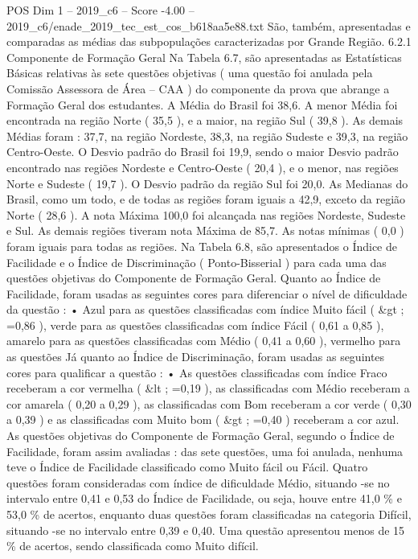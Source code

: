 \begin{textsample}{POS Dim 1 – 2019\_c6 – Score -4.00 – 2019\_c6/enade\_2019\_tec\_est\_cos\_b618aa5e88.txt}
São, também, apresentadas e comparadas as médias das subpopulações caracterizadas por Grande Região. 6.2.1 Componente de Formação Geral Na Tabela 6.7, são apresentadas as Estatísticas Básicas relativas às sete questões objetivas ( uma questão foi anulada pela Comissão Assessora de Área – CAA ) do componente da prova que abrange a Formação Geral dos estudantes.
A Média do Brasil foi 38,6.
A menor Média foi encontrada na região Norte ( 35,5 ), e a maior, na região Sul ( 39,8 ).
As demais Médias foram : 37,7, na região Nordeste, 38,3, na região Sudeste e 39,3, na região Centro-Oeste.
O Desvio padrão do Brasil foi 19,9, sendo o maior Desvio padrão encontrado nas regiões Nordeste e Centro-Oeste ( 20,4 ), e o menor, nas regiões Norte e Sudeste ( 19,7 ).
O Desvio padrão da região Sul foi 20,0.
As Medianas do Brasil, como um todo, e de todas as regiões foram iguais a 42,9, exceto da região Norte ( 28,6 ).
A nota Máxima 100,0 foi alcançada nas regiões Nordeste, Sudeste e Sul.
As demais regiões tiveram nota Máxima de 85,7.
As notas mínimas ( 0,0 ) foram iguais para todas as regiões.
Na Tabela 6.8, são apresentados o Índice de Facilidade e o Índice de Discriminação ( Ponto-Bisserial ) para cada uma das questões objetivas do Componente de Formação Geral.
Quanto ao Índice de Facilidade, foram usadas as seguintes cores para diferenciar o nível de dificuldade da questão : • Azul para as questões classificadas com índice Muito fácil ( \&gt ; =0,86 ), verde para as questões classificadas com índice Fácil ( 0,61 a 0,85 ), amarelo para as questões classificadas com Médio ( 0,41 a 0,60 ), vermelho para as questões Já quanto ao Índice de Discriminação, foram usadas as seguintes cores para qualificar a questão : • As questões classificadas com índice Fraco receberam a cor vermelha ( \&lt ; =0,19 ), as classificadas com Médio receberam a cor amarela ( 0,20 a 0,29 ), as classificadas com Bom receberam a cor verde ( 0,30 a 0,39 ) e as classificadas com Muito bom ( \&gt ; =0,40 ) receberam a cor azul.
As questões objetivas do Componente de Formação Geral, segundo o Índice de Facilidade, foram assim avaliadas : das sete questões, uma foi anulada, nenhuma teve o Índice de Facilidade classificado como Muito fácil ou Fácil.
Quatro questões foram consideradas com índice de dificuldade Médio, situando -se no intervalo entre 0,41 e 0,53 do Índice de Facilidade, ou seja, houve entre 41,0 \% e 53,0 \% de acertos, enquanto duas questões foram classificadas na categoria Difícil, situando -se no intervalo entre 0,39 e 0,40.
Uma questão apresentou menos de 15 \% de acertos, sendo classificada como Muito difícil.

\end{textsample}
